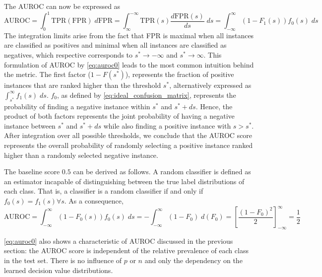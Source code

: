 The AUROC can now be expressed as
%
\begin{equation}
    \text{AUROC}
    = \int_{0}^{1} \text{TPR}(\text{FPR}) \;d\text{FPR}
    = \int_{\infty}^{-\infty} \text{TPR}(s) \frac{d\text{FPR}(s)}{ds} \;ds
    = \int_{-\infty}^{\infty} (1 - F_1(s)) f_0(s) \;ds
    \label{eq:auroc0}
\end{equation}
%
The integration limits arise from the fact that FPR is maximal when all instances are classified as positives
and minimal when all instances are classified as negatives, which respective corresponds to $s^* \to -\infty$ and $s^* \to \infty$. This formulation of AUROC by \autoref{eq:auroc0} leads to the most common intuition behind the metric.
%
The first factor ($1- F(s^*)$), represents the fraction of positive instances that are ranked higher than the threshold $s^*$, alternatively expressed as $\int_{s^*}^{\infty}f_1(s)\; ds$. $f_0$, as defined by \autoref{eq:ideal_confusion_matrix}, represents the probability of finding a negative instance within $s^*$ and $s^* + ds$. Hence, the product of both factors represents the joint probability of having a negative instance between $s^*$ and $s^* + ds$ while also finding a positive instance with $s > s^\ast$. 
%
After integration over all possible thresholds, we conclude that the AUROC score represents the overall probability of randomly selecting a positive instance ranked higher than a randomly selected negative instance.

The baseline score $0.5$ can be derived as follows. A random classifier is defined as an estimator incapable of distinguishing between the true label distributions of each class. That is, a classifier is a random classifier if and only if $f_0(s) = f_1(s) \forall s$. As a consequence,
%
\begin{equation}
    \text{AUROC}
    = \int_{-\infty}^{\infty} (1 - F_0(s)) f_0(s) \;ds
    = -\int_{-\infty}^{\infty} (1 - F_0) \;d(F_0)
    = \left[\frac{(1-F_0)^2}{2}\right]_{-\infty}^{\infty}
    = \frac{1}{2}
    \label{eq:auroc_random}
\end{equation}
 
\autoref{eq:auroc0} also shows a characteristic of AUROC discussed in the previous section: the AUROC score is independent of the relative prevalence of each class in the test set. There is no influence of $p$ or $n$ and only the dependency on the learned decision value distributions.
%

